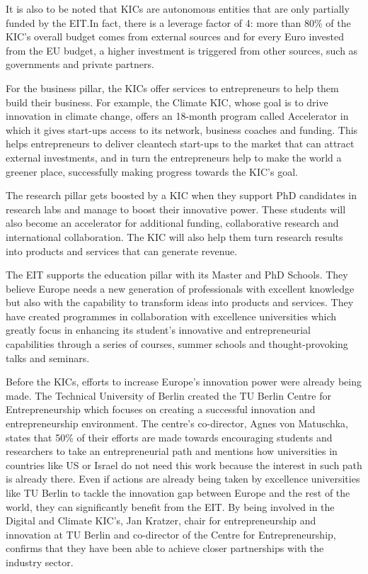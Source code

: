 \documentclass[11pt,a4paper,oneside,twocolumn]{IEEEtran}
\begin{document}
It is also to be noted that KICs are autonomous  entities that are only partially funded by the EIT.\@ In fact, there is a leverage factor of 4: more than 80\% of the KIC’s overall budget comes from external sources and for every Euro invested from the EU budget, a higher investment is triggered from other sources, such as governments and private partners\cite{4_2}.


For the business pillar, the KICs offer services to entrepreneurs to help them build their business. For example, the Climate KIC, whose goal is to drive innovation in climate change, offers an 18-month program called Accelerator in which it gives start-ups access to its network, business coaches and funding. This helps entrepreneurs to deliver cleantech start-ups to the market that can attract external investments, and in turn the entrepreneurs help to make the world a greener place, successfully making progress towards the KIC’s goal\cite{4_3}.

The research pillar gets boosted by a KIC when they support PhD candidates in research labs and manage to boost their innovative power. These students will also become an accelerator for additional funding, collaborative research and international collaboration. The KIC will also help them turn research results into products and services that can generate revenue.

The EIT supports the education pillar with its Master and PhD Schools. They believe Europe needs a new generation of professionals with excellent knowledge but also with the capability to transform ideas into products and services. They have created programmes in collaboration with excellence universities which greatly focus in enhancing its student’s innovative and entrepreneurial capabilities through a series of courses, summer schools and thought-provoking talks and seminars.

Before the KICs, efforts to increase Europe’s innovation power were already being made. The Technical University of Berlin created the TU Berlin Centre for Entrepreneurship which focuses on creating a successful innovation and entrepreneurship environment.
The centre’s co-director, Agnes von Matuschka, states that 50\% of their efforts are made towards encouraging students and researchers to take an entrepreneurial path and mentions how universities in countries like US or Israel do not need this work because the interest in such path is already there.
Even if actions are already being taken by excellence universities like TU Berlin to tackle the innovation gap between Europe and the rest of the world, they can significantly benefit from the EIT.\@
By being involved in the Digital and Climate KIC’s, Jan Kratzer, chair for entrepreneurship and innovation at TU Berlin and co-director of the Centre for Entrepreneurship, confirms that they have been able to achieve closer partnerships with the industry sector\cite{4_4}.
\end{document}
